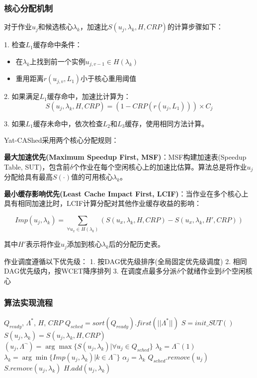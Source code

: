 \documentclass[12pt]{article}
\begin{document}
\subsubsection{核心分配机制}

对于作业$u_j$和候选核心$\lambda_k$，加速比$S(u_j, \lambda_k, H, CRP)$的计算步骤如下：

1. 检查$L_1$缓存命中条件：
   \begin{itemize}
       \item 在$\lambda_k$上找到前一个实例$u_{j,v-1} \in H(\lambda_k)$
       \item 重用距离$r(u_{j,v}, L_1)$小于核心重用阈值
   \end{itemize}

2. 如果满足$L_1$缓存命中，加速比计算为：
   $$S(u_j, \lambda_k, H, CRP) = (1 - CRP(r(u_j, L_1))) \times C_j$$

3. 如果$L_1$缓存未命中，依次检查$L_2$和$L_3$缓存，使用相同方法计算。

Yat-CAShed采用两个核心分配规则：

\textbf{最大加速优先(Maximum Speedup First, MSF)}：MSF构建加速表(Speedup Table, SUT)，包含前$\delta$个作业在每个空闲核心上的加速比估算。算法总是将作业$u_j$分配给具有最高$S(\cdot)$值的可用核心$\lambda_k$。

\textbf{最小缓存影响优先(Least Cache Impact First, LCIF)}：当作业在多个核心上具有相同加速比时，LCIF计算分配对其他作业缓存收益的影响：

$$Imp(u_j, \lambda_k) = \sum_{\forall u_x \in H(\lambda_k)} (S(u_x, \lambda_k, H, CRP) - S(u_x, \lambda_k, H', CRP))$$

其中$H'$表示将作业$u_j$添加到核心$\lambda_k$后的分配历史表。

作业调度遵循以下优先级：
1. 按DAG优先级排序(全局固定优先级调度)
2. 相同DAG优先级内，按WCET降序排列
3. 在调度点最多分派$\delta$个就绪作业到$\delta$个空闲核心

\subsubsection{算法实现流程}

\begin{algorithm}
\caption{Yat-CAShed在线分配算法}
\begin{algorithmic}[1]
\REQUIRE $Q_{ready}$, $\Lambda^*$, $H$, $CRP$
\STATE $Q_{sched} = sort(Q_{ready}).first(||\Lambda^*||)$
\STATE $S = init\_SUT()$
        \STATE $S(u_j, \lambda_k) = S(u_j, \lambda_k, H, CRP)$
    \ENDFOR
\ENDFOR
{}
    \STATE $(u_j, \Lambda^{\neg}) = \arg\max\{S(u_j, \lambda_k) | \forall u_j \in Q_{sched}\}$
        \STATE $\lambda_k = \Lambda^{\neg}(1)$
    \ELSE
        \STATE $\lambda_k = \arg\min\{Imp(u_j, \lambda_k) | k \in \Lambda^{\neg}\}$
    \ENDIF
    \STATE $\alpha_j = \lambda_k$
    \STATE $Q_{sched}.remove(u_j)$
    \STATE $S.remove(u_j, \lambda_k)$
    \STATE $H.add(u_j, \lambda_k)$
\ENDWHILE
\end{algorithmic}
\end{algorithm}
\end{document}
